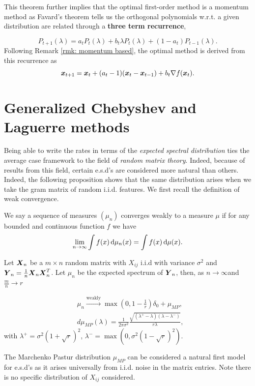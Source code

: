 \documentclass{article}
\begin{document}
This theorem further implies that the optimal first-order method is a momentum method as Favard's theorem \cite{marcellan2001favard} tells us the orthogonal polynomials w.r.t. a given distribution are related through a \textbf{three term recurrence},

\begin{equation}
    P_{t+1}(\lambda)=a_tP_t(\lambda)+b_t\lambda P_t(\lambda)+(1-a_t)P_{t-1}(\lambda).
\end{equation}
Following Remark \ref{rmk: momentum based}, the optimal method is derived from this recurrence as
\begin{equation}
    {\boldsymbol x}_{t+1}={\boldsymbol x}_t+(a_t-1)({\boldsymbol x}_t-{\boldsymbol x}_{t-1})+b_t\nabla f({\boldsymbol x}_t).
\end{equation}



\section{Generalized Chebyshev and Laguerre methods} \label{section: methods}
Being able to write the rates in terms of the \textit{expected spectral distribution} ties the average case framework to the field of \textit{random matrix theory}. Indeed, because of results from this field, certain e.s.d's are considered more natural than others. Indeed, the following proposition shows that the same distribution arises when we take the gram matrix of random i.i.d. features. We first recall the definition of weak convergence.%

\begin{definition}
We say a sequence of measures $(\mu_n)$ converges weakly to a measure $\mu$ if for any bounded and continuous function $f$ we have
\begin{equation}
    \lim_{n\rightarrow\infty}\int f(x)\mathop{}\!\mathrm{d} \mu_n(x)=\int f(x) \mathop{}\!\mathrm{d}\mu(x)
.
\end{equation}

\end{definition}

\begin{prop}
Let ${\boldsymbol X}_n$ be a $m\times n$ random matrix with $X_{ij}$ i.i.d with variance $\sigma^2$ and ${\boldsymbol Y}_n=\frac{1}{n}{\boldsymbol X}_n{\boldsymbol X}_n^T$. Let $\mu_n$ be the expected spectrum of ${\boldsymbol Y}_n$, then, as $n\rightarrow\infty$and  $\frac{m}{n} \rightarrow r$

\begin{align*}
&\mu_n\xrightarrow{\text{weakly}}{}\max(0,1-\frac{1}{r})\delta_0+\mu_{MP}, \\
&d\mu_{MP}(\lambda)=\frac{1}{2\pi\sigma^2}\frac{\sqrt{(\lambda^+-\lambda)(\lambda-\lambda^-)}}{r\lambda} ,
\end{align*}
with $\lambda^+=\sigma^2(1+\sqrt{r})^2$, $\lambda^-=\max(0,\sigma^2(1-\sqrt{r})^2)$.

\end{prop}
The Marchenko Pastur distribution $\mu_{MP}$ can be considered a natural first model for e.s.d's as it arises universally from i.i.d. noise in the matrix entries. Note there is no specific distribution of $X_{ij}$ considered. 
\end{document}
